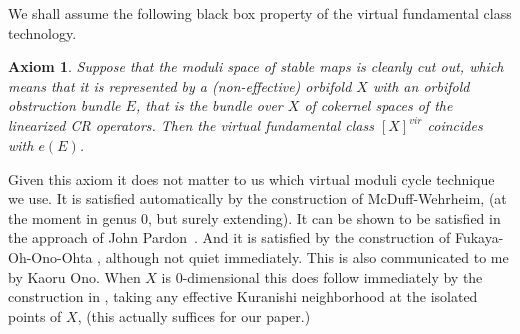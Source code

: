 \documentclass{amsart}
\numberwithin{equation}{section}
\newtheorem{axiom}[equation]{Axiom}
\theoremstyle{definition}
\theoremstyle{remark}
\begin{document}
\begin {appendices}
We shall assume the following black box property of the virtual fundamental
class technology.
\begin{axiom} \label{axiom:GW} Suppose that the moduli space of stable maps is cleanly cut out, 
   which means that it is represented by a (non-effective) orbifold $X$ with an orbifold
   obstruction bundle $E$, that is the bundle over $X$ of cokernel spaces of the linearized CR operators.
   Then the virtual fundamental class $[X]^ {vir} $
   coincides with $e (E)$.
\end{axiom}
Given this axiom it does not matter to us which virtual moduli cycle technique
we use. It is satisfied automatically by the construction of McDuff-Wehrheim,
(at the moment in genus 0, but surely extending).
It can be shown to be satisfied in the approach of John Pardon~\cite{citePardonAlgebraicApproach}.
And it is satisfied by the construction of Fukaya-Oh-Ono-Ohta
\cite{citeFOOOTechnicaldetails}, although not quiet immediately. This is also
communicated to me by Kaoru Ono. 
When $X$ is 0-dimensional this does follow
 immediately by the construction in
\cite{citeFukayaOnoArnoldandGW}, taking any effective Kuranishi neighborhood
at the isolated points of $X$, (this actually suffices for our paper.)  



\end{appendices}
\end{document}
